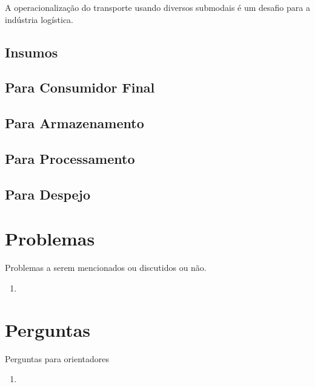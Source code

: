 \documentclass[]{article}
\begin{document}
		A operacionalização do transporte usando diversos submodais é um desafio para a indústria logística.   


	\subsection{Insumos}
	
	\subsection{Para Consumidor Final}
	
		
	
	\subsection{Para Armazenamento}
	
	\subsection{Para Processamento}
	
	\subsection{Para Despejo}
	
	
	
	
	
	
	
	
	
	
	
	\section{Problemas}
	
	Problemas a serem mencionados ou discutidos ou não.
	
	\begin{enumerate}

		\item 
	\end{enumerate}
	
	\section{Perguntas}
	
	Perguntas para orientadores
	
	\begin{enumerate}
		
		\item 
		
	\end{enumerate}
	
\end{document}
